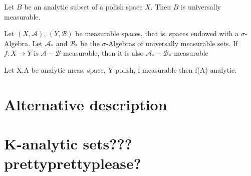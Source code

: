 \documentclass[10pt, a4paper, titlepage]{article}
\numberwithin{equation}{section}
\begin{document}
\begin{theorem}
	Let $B$ be an analytic subset of a polish space $X$. Then $B$ is universally measurable.
\end{theorem}

\begin{theorem}
	Let $(X,\mathcal{A})$,  $\left( Y, \mathcal{B} \right) $ be measurable spaces, that is, spaces endowed with a $\sigma$-Algebra.  
	Let $\mathcal{A}_*$ and $\mathcal{B}_*$ be the $\sigma$-Algebras of universally measurable sets.
	If  $f:X \to Y$ is  $\mathcal{A}- \mathcal{B}$-measurable, then it is also $\mathcal{A}_*-\mathcal{B}_*$-measurable
\end{theorem}


\begin{definition}
	
\end{definition}

\begin{theorem}
	Let X,A be analytic meas. space, Y polish, f measurable then f(A) analytic.
\end{theorem}




\section{Alternative description}




\section{K-analytic sets??? prettyprettyplease?}
































\vspace{\fill}
\nocite{*}
\printbibliography{}
\end{document}
